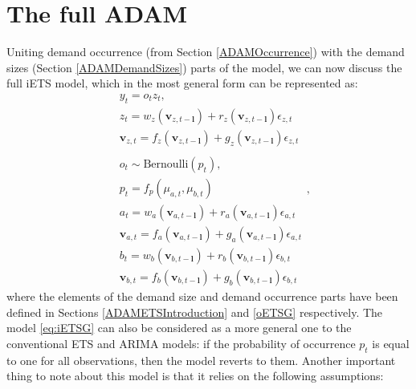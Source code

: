 \documentclass[]{book}
\theoremstyle{definition}
\theoremstyle{definition}
\theoremstyle{definition}
\theoremstyle{definition}
\theoremstyle{remark}
\begin{document}
\hypertarget{ADAMIntermittentFull}{%
\section{The full ADAM}\label{ADAMIntermittentFull}}

Uniting demand occurrence (from Section \ref{ADAMOccurrence}) with the demand sizes (Section \ref{ADAMDemandSizes}) parts of the model, we can now discuss the full iETS model, which in the most general form can be represented as:
\begin{equation}
\begin{aligned}
& y_t = o_t z_t , \\
& {z}_{t} = w_z(\mathbf{v}_{z,t-\mathbf{l}}) + r_z(\mathbf{v}_{z,t-\mathbf{l}}) \epsilon_{z,t} \\
& \mathbf{v}_{z,t} = f_z(\mathbf{v}_{z,t-\mathbf{l}}) + g_z(\mathbf{v}_{z,t-\mathbf{l}}) \epsilon_{z,t} \\
& \\
& o_t \sim \text{Bernoulli} \left(p_t \right) , \\
& p_t = f_p(\mu_{a,t}, \mu_{b,t}) \\
& a_t = w_a(\mathbf{v}_{a,t-\mathbf{l}}) + r_a(\mathbf{v}_{a,t-\mathbf{l}}) \epsilon_{a,t} \\
& \mathbf{v}_{a,t} = f_a(\mathbf{v}_{a,t-\mathbf{l}}) + g_a(\mathbf{v}_{a,t-\mathbf{l}}) \epsilon_{a,t} \\
& b_t = w_b(\mathbf{v}_{b,t-\mathbf{l}}) + r_b(\mathbf{v}_{b,t-\mathbf{l}}) \epsilon_{b,t} \\
& \mathbf{v}_{b,t} = f_b(\mathbf{v}_{b,t-\mathbf{l}}) + g_b(\mathbf{v}_{b,t-\mathbf{l}}) \epsilon_{b,t}
\end{aligned} ,
\label{eq:iETSG}
\end{equation}
where the elements of the demand size and demand occurrence parts have been defined in Sections \ref{ADAMETSIntroduction} and \ref{oETSG} respectively. The model \eqref{eq:iETSG} can also be considered as a more general one to the conventional ETS and ARIMA models: if the probability of occurrence \(p_t\) is equal to one for all observations, then the model reverts to them. Another important thing to note about this model is that it relies on the following assumptions:
\end{document}
